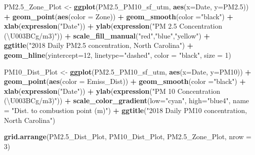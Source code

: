 \documentclass[12pt,]{article}
\newenvironment{Shaded}{\begin{snugshade}}{\end{snugshade}}
\newcommand{\KeywordTok}[1]{\textcolor[rgb]{0.13,0.29,0.53}{\textbf{#1}}}
\newcommand{\DataTypeTok}[1]{\textcolor[rgb]{0.13,0.29,0.53}{#1}}
\newcommand{\DecValTok}[1]{\textcolor[rgb]{0.00,0.00,0.81}{#1}}
\newcommand{\StringTok}[1]{\textcolor[rgb]{0.31,0.60,0.02}{#1}}
\newcommand{\OperatorTok}[1]{\textcolor[rgb]{0.81,0.36,0.00}{\textbf{#1}}}
\newcommand{\NormalTok}[1]{#1}
\begin{document}
\begin{Shaded}
\begin{Highlighting}[]
\NormalTok{PM2.5_Zone_Plot <-}\StringTok{ }\KeywordTok{ggplot}\NormalTok{(PM2.5_PM10_sf_utm, }\KeywordTok{aes}\NormalTok{(}\DataTypeTok{x=}\NormalTok{Date, }\DataTypeTok{y=}\NormalTok{PM2.}\DecValTok{5}\NormalTok{)) }\OperatorTok{+}
\StringTok{  }\KeywordTok{geom_point}\NormalTok{(}\KeywordTok{aes}\NormalTok{(}\DataTypeTok{color =}\NormalTok{ Zone)) }\OperatorTok{+}
\StringTok{  }\KeywordTok{geom_smooth}\NormalTok{(}\DataTypeTok{color =}\StringTok{"black"}\NormalTok{) }\OperatorTok{+}
\StringTok{  }\KeywordTok{xlab}\NormalTok{(}\KeywordTok{expression}\NormalTok{(}\StringTok{"Date"}\NormalTok{)) }\OperatorTok{+}
\StringTok{  }\KeywordTok{ylab}\NormalTok{(}\KeywordTok{expression}\NormalTok{(}\StringTok{"PM 2.5 Concentration (\textbackslash{}U003BCg/m3)"}\NormalTok{)) }\OperatorTok{+}
\StringTok{  }\KeywordTok{scale_fill_manual}\NormalTok{(}\StringTok{"red"}\NormalTok{,}\StringTok{"blue"}\NormalTok{,}\StringTok{"yellow"}\NormalTok{)  }\OperatorTok{+}
\StringTok{  }\KeywordTok{ggtitle}\NormalTok{(}\StringTok{"2018 Daily PM2.5 concentration, North Carolina"}\NormalTok{) }\OperatorTok{+}
\StringTok{  }\KeywordTok{geom_hline}\NormalTok{(}\DataTypeTok{yintercept=}\DecValTok{12}\NormalTok{, }\DataTypeTok{linetype=}\StringTok{"dashed"}\NormalTok{, }\DataTypeTok{color =} \StringTok{"black"}\NormalTok{, }\DataTypeTok{size =} \DecValTok{1}\NormalTok{)}

\NormalTok{PM10_Dist_Plot <-}\StringTok{ }\KeywordTok{ggplot}\NormalTok{(PM2.5_PM10_sf_utm, }\KeywordTok{aes}\NormalTok{(}\DataTypeTok{x=}\NormalTok{Date, }\DataTypeTok{y=}\NormalTok{PM10)) }\OperatorTok{+}
\StringTok{  }\KeywordTok{geom_point}\NormalTok{(}\KeywordTok{aes}\NormalTok{(}\DataTypeTok{color =}\NormalTok{ Emiss_Dist)) }\OperatorTok{+}
\StringTok{  }\KeywordTok{geom_smooth}\NormalTok{(}\DataTypeTok{color =}\StringTok{"black"}\NormalTok{) }\OperatorTok{+}
\StringTok{  }\KeywordTok{xlab}\NormalTok{(}\KeywordTok{expression}\NormalTok{(}\StringTok{"Date"}\NormalTok{)) }\OperatorTok{+}
\StringTok{  }\KeywordTok{ylab}\NormalTok{(}\KeywordTok{expression}\NormalTok{(}\StringTok{"PM 10 Concentration (\textbackslash{}U003BCg/m3)"}\NormalTok{)) }\OperatorTok{+}
\StringTok{  }\KeywordTok{scale_color_gradient}\NormalTok{(}\DataTypeTok{low=}\StringTok{"cyan"}\NormalTok{, }\DataTypeTok{high=}\StringTok{"blue4"}\NormalTok{, }\DataTypeTok{name =} \StringTok{"Dist. to combustion point (m)"}\NormalTok{)  }\OperatorTok{+}
\StringTok{  }\KeywordTok{ggtitle}\NormalTok{(}\StringTok{"2018 Daily PM10 concentration, North Carolina"}\NormalTok{)}

\KeywordTok{grid.arrange}\NormalTok{(PM2.5_Dist_Plot, PM10_Dist_Plot, PM2.5_Zone_Plot, }\DataTypeTok{nrow =} \DecValTok{3}\NormalTok{)}


\end{Highlighting}
\end{Shaded}
\end{document}
